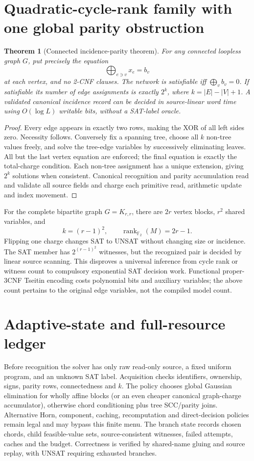 \documentclass[11pt]{article}
\newtheorem{theorem}{Theorem}
\begin{document}
\section{Quadratic-cycle-rank family with one global parity obstruction}
\begin{theorem}[Connected incidence-parity theorem]
For any connected loopless graph $G$, put precisely the equation
\[
\bigoplus_{e\ni v}x_e=b_v
\]
at each vertex, and no 2-CNF clauses. The network is satisfiable iff $\bigoplus_v b_v=0$. If satisfiable its number of edge assignments is exactly $2^k$, where $k=|E|-|V|+1$. A validated canonical incidence record can be decided in source-linear word time using $O(\log L)$ writable bits, without a SAT-label oracle.
\end{theorem}
\begin{proof}
Every edge appears in exactly two rows, making the XOR of all left sides zero. Necessity follows. Conversely fix a spanning tree, choose all $k$ non-tree values freely, and solve the tree-edge variables by successively eliminating leaves. All but the last vertex equation are enforced; the final equation is exactly the total-charge condition. Each non-tree assignment has a unique extension, giving $2^k$ solutions when consistent. Canonical recognition and parity accumulation read and validate all source fields and charge each primitive read, arithmetic update and index movement.
\end{proof}
For the complete bipartite graph $G=K_{r,r}$, there are $2r$ vertex blocks, $r^2$ shared variables, and
\[
k=(r-1)^2,\qquad \operatorname{rank}_{\mathbb F_2}(M)=2r-1.
\]
Flipping one charge changes SAT to UNSAT without changing size or incidence. The SAT member has $2^{(r-1)^2}$ witnesses, but the recognized pair is decided by linear source scanning. This disproves a universal inference from cycle rank or witness count to compulsory exponential SAT decision work. Functional proper-3CNF Tseitin encoding costs polynomial bits and auxiliary variables; the above count pertains to the original edge variables, not the compiled model count.

\section{Adaptive-state and full-resource ledger}
Before recognition the solver has only raw read-only source, a fixed uniform program, and an unknown SAT label. Acquisition checks identifiers, ownership, signs, parity rows, connectedness and $k$. The policy chooses global Gaussian elimination for wholly affine blocks (or an even cheaper canonical graph-charge accumulator), otherwise chord conditioning plus tree SCC/parity joins. Alternative Horn, component, caching, recomputation and direct-decision policies remain legal and may bypass this finite menu. The branch state records chosen chords, child feasible-value sets, source-consistent witnesses, failed attempts, caches and the budget. Correctness is verified by shared-name gluing and source replay, with UNSAT requiring exhausted branches.
\end{document}
